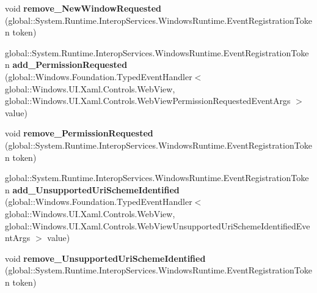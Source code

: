 \begin{DoxyCompactItemize}
void {\bfseries remove\+\_\+\+New\+Window\+Requested} (global\+::\+System.\+Runtime.\+Interop\+Services.\+Windows\+Runtime.\+Event\+Registration\+Token token)
\item 
\mbox{\label{interface_windows_1_1_u_i_1_1_xaml_1_1_controls_1_1_i_web_view4_adc0957ca3dc33612444167bf57005531}} 
global\+::\+System.\+Runtime.\+Interop\+Services.\+Windows\+Runtime.\+Event\+Registration\+Token {\bfseries add\+\_\+\+Permission\+Requested} (global\+::\+Windows.\+Foundation.\+Typed\+Event\+Handler$<$ global\+::\+Windows.\+U\+I.\+Xaml.\+Controls.\+Web\+View, global\+::\+Windows.\+U\+I.\+Xaml.\+Controls.\+Web\+View\+Permission\+Requested\+Event\+Args $>$ value)
\item 
\mbox{\label{interface_windows_1_1_u_i_1_1_xaml_1_1_controls_1_1_i_web_view4_a991ecf7ea74a7ba6b4e0df9150bd903e}} 
void {\bfseries remove\+\_\+\+Permission\+Requested} (global\+::\+System.\+Runtime.\+Interop\+Services.\+Windows\+Runtime.\+Event\+Registration\+Token token)
\item 
\mbox{\label{interface_windows_1_1_u_i_1_1_xaml_1_1_controls_1_1_i_web_view4_a6e70ca803e5cf51c343058bd94efe3cb}} 
global\+::\+System.\+Runtime.\+Interop\+Services.\+Windows\+Runtime.\+Event\+Registration\+Token {\bfseries add\+\_\+\+Unsupported\+Uri\+Scheme\+Identified} (global\+::\+Windows.\+Foundation.\+Typed\+Event\+Handler$<$ global\+::\+Windows.\+U\+I.\+Xaml.\+Controls.\+Web\+View, global\+::\+Windows.\+U\+I.\+Xaml.\+Controls.\+Web\+View\+Unsupported\+Uri\+Scheme\+Identified\+Event\+Args $>$ value)
\item 
\mbox{\label{interface_windows_1_1_u_i_1_1_xaml_1_1_controls_1_1_i_web_view4_a434db913b569c214fdd8ee1886fb3295}} 
void {\bfseries remove\+\_\+\+Unsupported\+Uri\+Scheme\+Identified} (global\+::\+System.\+Runtime.\+Interop\+Services.\+Windows\+Runtime.\+Event\+Registration\+Token token)
\item 
\mbox{\label{interface_windows_1_1_u_i_1_1_xaml_1_1_controls_1_1_i_web_view4_a31260436a1ad23171cfab6d9aa36d4d0}} 

\end{DoxyCompactItemize}
